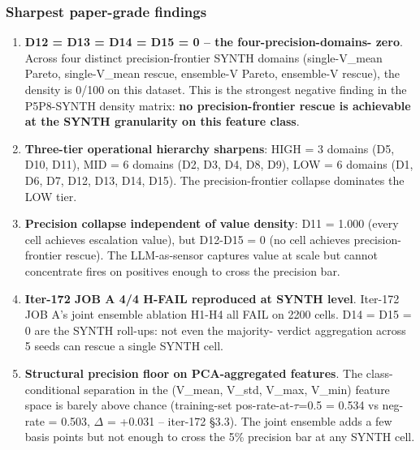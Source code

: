 \documentclass{article}
\begin{document}
\subsubsection{Sharpest paper-grade findings}
\begin{enumerate}
\item \textbf{D12 = D13 = D14 = D15 = 0 -- the four-precision-domains-
zero}. Across four distinct precision-frontier SYNTH domains
(single-V\_mean Pareto, single-V\_mean rescue, ensemble-V Pareto,
ensemble-V rescue), the density is 0/100 on this dataset. This is
the strongest negative finding in the P5P8-SYNTH density matrix:
\textbf{no precision-frontier rescue is achievable at the SYNTH
granularity on this feature class}.
\item \textbf{Three-tier operational hierarchy sharpens}: HIGH = 3
domains (D5, D10, D11), MID = 6 domains (D2, D3, D4, D8, D9), LOW
= 6 domains (D1, D6, D7, D12, D13, D14, D15). The precision-frontier
collapse dominates the LOW tier.
\item \textbf{Precision collapse independent of value density}: D11
= 1.000 (every cell achieves escalation value), but D12-D15 = 0
(no cell achieves precision-frontier rescue). The LLM-as-sensor
captures value at scale but cannot concentrate fires on positives
enough to cross the precision bar.
\item \textbf{Iter-172 JOB A 4/4 H-FAIL reproduced at SYNTH level}.
Iter-172 JOB A's joint ensemble ablation H1-H4 all FAIL on 2200
cells. D14 = D15 = 0 are the SYNTH roll-ups: not even the majority-
verdict aggregation across 5 seeds can rescue a single SYNTH cell.
\item \textbf{Structural precision floor on PCA-aggregated features}.
The class-conditional separation in the (V\_mean, V\_std, V\_max,
V\_min) feature space is barely above chance (training-set
pos-rate-at-$\tau$=0.5 = 0.534 vs neg-rate = 0.503, $\Delta$ = +0.031
-- iter-172 §3.3). The joint ensemble adds a few basis points but
not enough to cross the 5\% precision bar at any SYNTH cell.
\end{enumerate}
\end{document}
